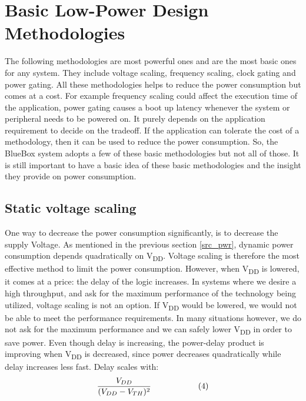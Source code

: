 \section{Basic Low-Power Design Methodologies}
 The following methodologies are most powerful ones and are the most basic ones for any system. They include voltage scaling, frequency scaling, clock gating and power gating. All these methodologies helps to reduce the power consumption but comes at a cost. For example frequency scaling could affect the execution time of the application, power gating causes a boot up latency whenever the system or peripheral needs to be powered on. It purely depends on the application requirement to decide on the tradeoff. If the application can tolerate the cost of a methodology, then it can be used to reduce the power consumption. So, the BlueBox system adopts a few of these basic methodologies but not all of those. It is still important to have a basic idea of these basic methodologies and the insight they provide on power consumption. 
 
 \subsection{Static voltage scaling}
 One way to decrease the power consumption significantly, is to decrease the supply Voltage. As mentioned in the previous section \ref{src_pwr}, dynamic power consumption depends quadratically on V\textsubscript{DD}. Voltage scaling is therefore the most effective method to limit the power consumption. However, when V\textsubscript{DD} is lowered, it comes at a price: the delay of the logic 
 increases. In systems where we desire a high throughput, and ask for the maximum performance of the technology being utilized, voltage scaling is not an option. If V\textsubscript{DD} would be lowered, we would not be able to meet the performance requirements. In many 
 situations however, we do not ask for the maximum performance and we can safely lower V\textsubscript{DD} in order to save power. Even though delay is increasing, the power-delay product is improving when V\textsubscript{DD} is decreased, since power decreases quadratically while delay increases less fast. Delay scales with:
 \vspace*{-2mm}
 \[ \frac{V_{DD}}{
 	(V_{DD} - V_{TH})^2
 	} \hspace{20mm}(4)\]     
 
